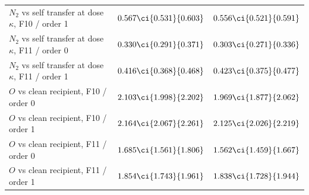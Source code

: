 \begin{table}[htbp]
\begin{tabular}{@{}lcc@{}}
$N_2$ vs self transfer at dose $\kappa$, F10 / order 1 & $0.567\ci{0.531}{0.603}$ & $0.556\ci{0.521}{0.591}$ \\
$N_2$ vs self transfer at dose $\kappa$, F11 / order 0 & $0.330\ci{0.291}{0.371}$ & $0.303\ci{0.271}{0.336}$ \\
$N_2$ vs self transfer at dose $\kappa$, F11 / order 1 & $0.416\ci{0.368}{0.468}$ & $0.423\ci{0.375}{0.477}$ \\
$O$ vs clean recipient, F10 / order 0 & $2.103\ci{1.998}{2.202}$ & $1.969\ci{1.877}{2.062}$ \\
$O$ vs clean recipient, F10 / order 1 & $2.164\ci{2.067}{2.261}$ & $2.125\ci{2.026}{2.219}$ \\
$O$ vs clean recipient, F11 / order 0 & $1.685\ci{1.561}{1.806}$ & $1.562\ci{1.459}{1.667}$ \\
$O$ vs clean recipient, F11 / order 1 & $1.854\ci{1.743}{1.961}$ & $1.838\ci{1.728}{1.944}$ \\
\bottomrule
\end{tabular}
\end{table}
